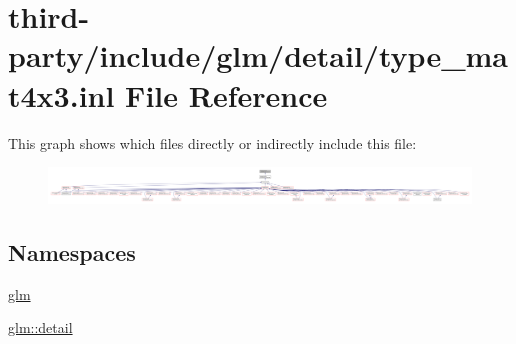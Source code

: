 \hypertarget{type__mat4x3_8inl}{}\section{third-\/party/include/glm/detail/type\+\_\+mat4x3.inl File Reference}
\label{type__mat4x3_8inl}
This graph shows which files directly or indirectly include this file\+:
\nopagebreak
\begin{figure}[H]
\begin{center}
\leavevmode
\includegraphics[width=350pt]{type__mat4x3_8inl__dep__incl}
\end{center}
\end{figure}
\subsection*{Namespaces}
\begin{DoxyCompactItemize}
\item 
 \hyperlink{namespaceglm}{glm}
\item 
 \hyperlink{namespaceglm_1_1detail}{glm\+::detail}
\end{DoxyCompactItemize}
